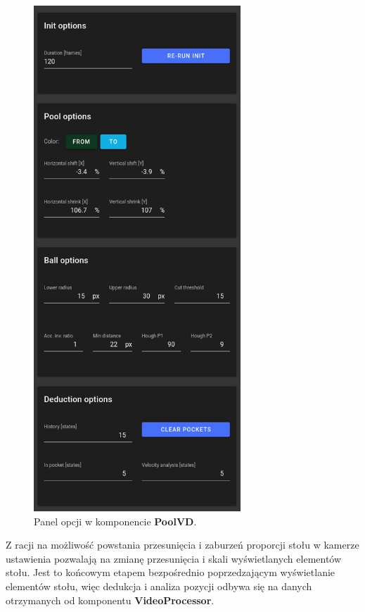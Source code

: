 \documentclass[12pt]{article}
\begin{document}
\begin{figure}[!htb]
    \centering
    \includegraphics[height=19cm]{./images/options.png}
    \caption{Panel opcji w komponencie \textbf{PoolVD}.}
    \label{options}
\end{figure}

Z racji na możliwość powstania przesunięcia i zaburzeń proporcji stołu w kamerze ustawienia pozwalają na zmianę przesunięcia i skali wyświetlanych elementów stołu. Jest to końcowym etapem bezpośrednio poprzedzającym wyświetlanie elementów stołu, więc dedukcja i analiza pozycji odbywa się na danych otrzymanych od komponentu \textbf{VideoProcessor}.
\end{document}
